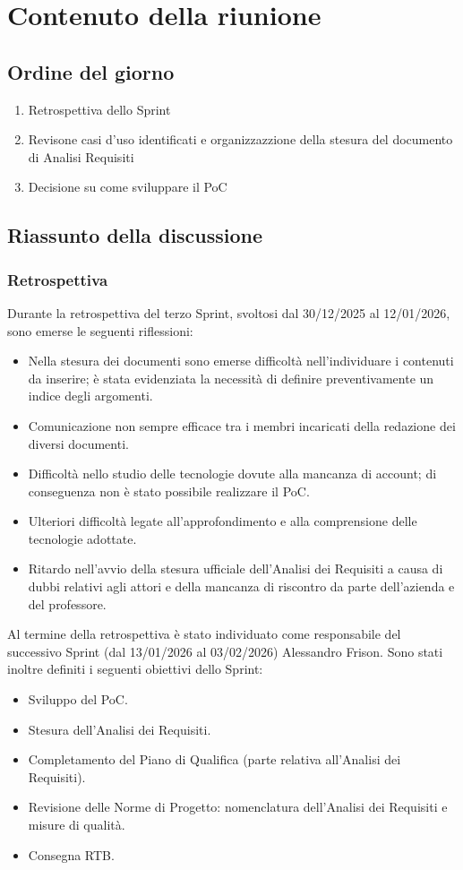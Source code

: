 \documentclass[a4paper, 11pt]{article}
\begin{document}
\section{Contenuto della riunione}

\subsection{Ordine del giorno}
\begin{enumerate}
    \item Retrospettiva dello Sprint
    \item Revisone casi d'uso identificati e organizzazzione della stesura del documento di Analisi Requisiti
    \item Decisione su come sviluppare il PoC
\end{enumerate}

\subsection{Riassunto della discussione}
\subsubsection{Retrospettiva}
Durante la retrospettiva del terzo Sprint, svoltosi dal 30/12/2025 al 12/01/2026, sono emerse le seguenti riflessioni:
\begin{itemize}
    \item Nella stesura dei documenti sono emerse difficoltà nell'individuare i contenuti da inserire; è stata evidenziata la necessità di definire preventivamente un indice degli argomenti.
    \item Comunicazione non sempre efficace tra i membri incaricati della redazione dei diversi documenti.
    \item Difficoltà nello studio delle tecnologie dovute alla mancanza di account; di conseguenza non è stato possibile realizzare il PoC.
    \item Ulteriori difficoltà legate all'approfondimento e alla comprensione delle tecnologie adottate.
    \item Ritardo nell'avvio della stesura ufficiale dell'Analisi dei Requisiti a causa di dubbi relativi agli attori e della mancanza di riscontro da parte dell'azienda e del professore.
\end{itemize}
Al termine della retrospettiva è stato individuato come responsabile del successivo Sprint (dal 13/01/2026 al 03/02/2026) Alessandro Frison. Sono stati inoltre definiti i seguenti obiettivi dello Sprint:
\begin{itemize}
    \item Sviluppo del PoC.
    \item Stesura dell'Analisi dei Requisiti.
    \item Completamento del Piano di Qualifica (parte relativa all'Analisi dei Requisiti).
    \item Revisione delle Norme di Progetto: nomenclatura dell'Analisi dei Requisiti e misure di qualità.
    \item Consegna RTB.
\end{itemize}
\end{document}
